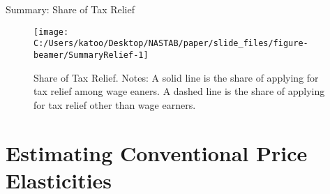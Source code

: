 \documentclass[
  ignorenonframetext,
  aspectratio=169,
]{beamer}
\begin{document}
\begin{frame}{Summary: Share of Tax Relief}
\protect\hypertarget{summary-share-of-tax-relief}{}
\begin{figure}[t]

{\centering \texttt{[image: C:/Users/katoo/Desktop/NASTAB/paper/slide\_files/figure-beamer/SummaryRelief-1]} 

}

\caption{Share of Tax Relief. Notes: A solid line is the share of applying for tax relief among wage eaners. A dashed line is the share of applying for tax relief other than wage earners.}\label{fig:SummaryRelief}
\end{figure}
\end{frame}

\hypertarget{estimating-conventional-price-elasticities}{%
\section{Estimating Conventional Price Elasticities}\label{estimating-conventional-price-elasticities}}
\end{document}
